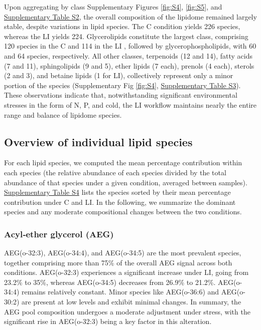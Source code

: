 \documentclass[10pt,letterpaper]{article}
\begin{document}
\begin{itemize}
Upon aggregating by class Supplementary Figures \ref{fig:S4}, \ref{fig:S5}, and \href{https://docs.google.com/spreadsheets/d/1SB90-QLYheKEzmHCUIh1UfgkrtbL064s8Oo5BfwFaV0/edit?gid=675277745#gid=675277745}{Supplementary Table S2}, the overall composition of the lipidome remained largely stable, despite variations in lipid species. The C condition yields 226 species, whereas the LI  yields 224. Glycerolipids constitute the largest class, comprising 120 species in the C and 114 in the LI , followed by glycerophospholipids, with 60 and 64 species, respectively. All other classes, terpenoids (12 and 14), fatty acids (7 and 11), sphingolipids (9 and 5), ether lipids (7 each), prenols (4 each), sterols (2 and 3), and betaine lipids (1 for LI), collectively represent only a minor portion of the species (Supplementary Fig \ref{fig:S4}, \href{https://docs.google.com/spreadsheets/d/1SB90-QLYheKEzmHCUIh1UfgkrtbL064s8Oo5BfwFaV0/edit?gid=675277745#gid=675277745}{Supplementary Table S3}). These observations indicate that, notwithstanding significant environmental stresses in the form of N, P, and cold, the LI workflow maintains nearly the entire range and balance of lipidome species.

\subsection*{Overview of individual lipid species}
For each lipid species, we computed the mean percentage contribution within each species (the relative abundance of each species divided by the total abundance of that species under a given condition, averaged between samples). \href{https://docs.google.com/spreadsheets/d/1SB90-QLYheKEzmHCUIh1UfgkrtbL064s8Oo5BfwFaV0/edit?gid=675277745#gid=675277745}{Supplementary Table S4} lists the species sorted by their mean percentage contribution under C and LI. In the following, we summarize the dominant species and any moderate compositional changes between the two conditions.

\subsubsection*{Acyl‐ether glycerol (AEG)} 
AEG(o-32:3), AEG(o-34:4), and AEG(o-34:5) are the most prevalent species, together comprising more than 75\% of the overall AEG signal across both conditions. AEG(o-32:3) experiences a significant increase under LI, going from 23.2\% to 35\%, whereas AEG(o-34:5) decreases from 26.9\% to 21.2\%. AEG(o-34:4) remains relatively constant. Minor species like AEG(o-36:6) and AEG(o-30:2) are present at low levels and exhibit minimal changes. In summary, the AEG pool composition undergoes a moderate adjustment under stress, with the significant rise in AEG(o-32:3) being a key factor in this alteration.


\end{itemize}
\end{document}
